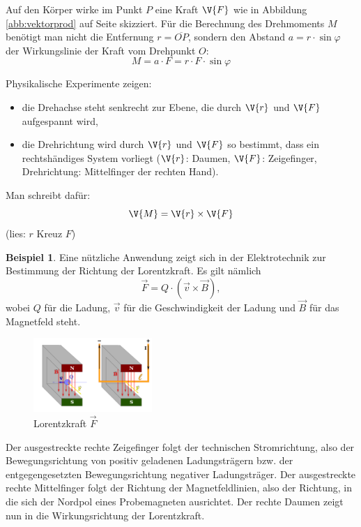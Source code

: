 \documentclass[%
11pt,%
twoside,%
titlepage,%
german,%
headsepline%
]{scrartcl}
\theoremstyle{definition}
\newtheorem{bsp}{Beispiel}[subsection] %
\theoremstyle{plain}
\begin{document}
Auf den Körper wirke im Punkt $P$ eine Kraft $\V{F}$ wie in Abbildung \ref{abb:vektorprod} auf Seite \pageref{abb:vektorprod} skizziert. Für die Berechnung des Drehmoments $M$ benötigt man nicht die Entfernung $r =\overline{OP}$, sondern den Abstand $a =r\cdot\sin\varphi$ der Wirkungslinie der Kraft vom Drehpunkt $O$:
$$M =a\cdot F =r\cdot F\cdot \sin\varphi$$

Physikalische Experimente zeigen:
\begin{itemize}
\item die Drehachse steht senkrecht zur Ebene, die durch
$\V{r}$ und $\V{F}$ aufgespannt wird,
\item die Drehrichtung wird durch $\V{r}$ und $\V{F}$ so bestimmt,
dass ein rechtshändiges System vorliegt ($\V{r}$: Daumen,
$\V{F}$: Zeigefinger, Drehrichtung: Mittelfinger der rechten Hand).
\end{itemize}
Man schreibt dafür:
$$\V{M}=\V{r}\times\V{F}$$
(lies: \glqq $r$ Kreuz $F$\grqq)

\begin{bsp}
Eine nützliche Anwendung zeigt sich in der Elektrotechnik zur Bestimmung der Richtung der Lorentzkraft. Es gilt nämlich
$$\vec{F}=Q\cdot(\vec{v}\times\vec{B}),$$
wobei $Q$ für die Ladung, $\vec{v}$ für die Geschwindigkeit der Ladung und $\vec{B}$ für das Magnetfeld steht.
\begin{figure}
\begin{center}
\includegraphics[width=0.4\textwidth]{pictures/lorentz.png}
\caption{Lorentzkraft $\vec{F}$}
\end{center}
\end{figure}
Der ausgestreckte rechte Zeigefinger folgt der technischen Stromrichtung, also der Bewegungsrichtung von positiv geladenen Ladungsträgern bzw. der entgegengesetzten Bewegungsrichtung negativer Ladungsträger.
Der ausgestreckte rechte Mittelfinger folgt der Richtung der Magnetfeldlinien, also der Richtung, in die sich der Nordpol eines Probemagneten ausrichtet.
Der rechte Daumen zeigt nun in die Wirkungsrichtung der Lorentzkraft.
\end{bsp}

\cleardoublepage

\listoffigures
\end{document}

